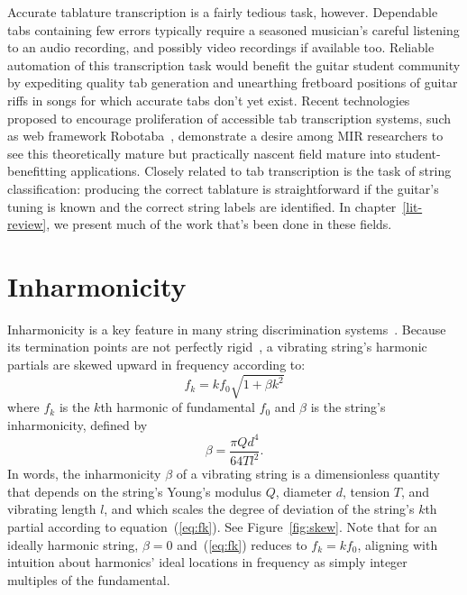 \documentclass[12pt]{cmuthesis}
\begin{document}
Accurate tablature transcription is a fairly tedious task, however. Dependable tabs containing few errors typically require a seasoned musician's careful listening to an audio recording, and possibly video recordings if available too. Reliable automation of this transcription task would benefit the guitar student community by expediting quality tab generation and unearthing fretboard positions of guitar riffs in songs for which accurate tabs don't yet exist. Recent technologies proposed to encourage proliferation of accessible tab transcription systems, such as web framework Robotaba~\cite{burlet2013}, demonstrate a desire among MIR researchers to see this theoretically mature but practically nascent field mature into student-benefitting applications. Closely related to tab transcription is the task of string classification: producing the correct tablature is straightforward if the guitar's tuning is known and the correct string labels are identified. In chapter~\ref{lit-review}, we present much of the work that's been done in these fields.

\section{Inharmonicity} Inharmonicity is a key feature in many string discrimination systems~\cite{barbanchoi2012,abesser2012,dittmar2013,kehling2014}. Because its termination points are not perfectly rigid~\cite{fletcher1998}, a vibrating string's harmonic partials are skewed upward in frequency according to: 
\begin{equation}
f_k = kf_{0}\sqrt{1+\beta k^2} \label{eq:fk}
\end{equation}
where $f_k$ is the $k$th harmonic of fundamental $f_0$ and $\beta$ is the string's inharmonicity, defined by
\begin{equation}
\beta = \frac{\pi Q d^4}{64 T l^2}. \label{eq:beta}
\end{equation}
In words, the inharmonicity $\beta$ of a vibrating string is a dimensionless quantity that depends on the string's Young's modulus $Q$, diameter $d$, tension $T$, and vibrating length $l$, and which scales the degree of deviation of the string's $k$th partial according to equation~(\ref{eq:fk}). See Figure~\ref{fig:skew}. Note that for an ideally harmonic string, $\beta = 0$ and~(\ref{eq:fk}) reduces to $f_k = kf_0$, aligning with intuition about harmonics' ideal locations in frequency as simply integer multiples of the fundamental.
\end{document}
